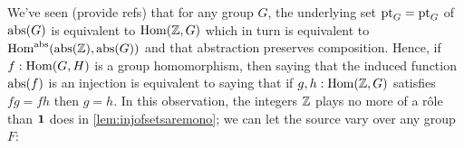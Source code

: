 

  


We've seen (provide refs) that for any group $G$, the underlying set $\mathrm{pt}_G=\mathrm{pt}_G$ of $\mathrm{abs}(G)$ is equivalent to $\mathrm{Hom}(\mathbb{Z},G)$ which in turn is equivalent to $\mathrm{Hom}^{\mathrm{abs}}(\mathrm{abs}(\mathbb{Z}),\mathrm{abs}(G))$ and that abstraction preserves composition.  Hence, if $f:\mathrm{Hom}(G,H)$ is a group homomorphism, then saying that the induced function
$\mathrm{abs}(f)$ is an injection is equivalent to saying that if $g,h:\mathrm{Hom}(\mathbb{Z},G)$ satisfies $fg=fh$ then $g=h$.  In this observation, the integers $\mathbb{Z}$ plays no more of a r\^ole than $\mathbf{1}$ does in \cref{lem:injofsetsaremono}; we can let the source vary over any group $F$: 


